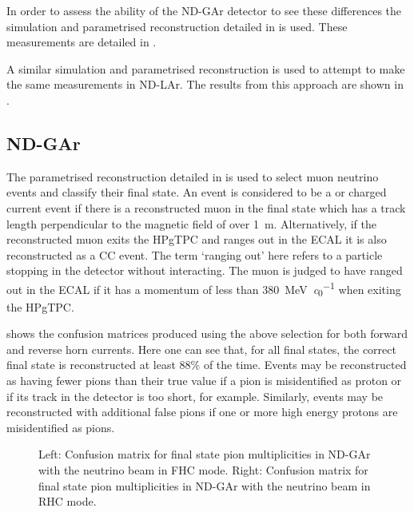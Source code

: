 In order to assess the ability of the ND-GAr detector to see these differences the simulation and parametrised reconstruction detailed in  is used.
These measurements are detailed in .

A similar simulation and parametrised reconstruction is used to attempt to make the same measurements in ND-LAr. 
The results from this approach are shown in .

\subsection{ND-GAr}
\label{sec:dune_ndrwt:pionMulti:gar}

The parametrised reconstruction detailed in  is used to select muon neutrino events and classify their final state.
An event is considered to be a \numu or \anumu charged current event if there is a reconstructed muon in the final state which has a track length perpendicular to the magnetic field of over \SI{1}{\metre}.
Alternatively, if the reconstructed muon exits the HPgTPC and ranges out in the ECAL it is also reconstructed as a \numu CC event.
The term `ranging out' here refers to a particle stopping in the detector without interacting.
The muon is judged to have ranged out in the ECAL if it has a momentum of less than \SI{380}{\MeV\per\clight} when exiting the HPgTPC. 

 shows the confusion matrices produced using the above selection for both forward and reverse horn currents. 
Here one can see that, for all final states, the correct final state is reconstructed at least 88\% of the time.
Events may be reconstructed as having fewer pions than their true value if a pion is misidentified as proton or if its track in the detector is too short, for example.
Similarly, events may be reconstructed with additional false pions if one or more high energy protons are misidentified as pions.

\begin{figure}[h]
	\begin{minipage}[t]{.5\linewidth}
		\begin{adjustbox}{max totalsize=\linewidth, center}
			
		\end{adjustbox}
	\end{minipage}
	\hfill
	\begin{minipage}[t]{.5\linewidth}
		\begin{adjustbox}{max totalsize=\linewidth, center}
			
		\end{adjustbox}
	\end{minipage}
	\caption[Confusion matrices for final state pion multiplicities in ND-GAr.]{Left: Confusion matrix for final state pion multiplicities in ND-GAr with the neutrino beam in FHC mode. Right: Confusion matrix for final state pion multiplicities in ND-GAr with the neutrino beam in RHC mode.}
	\label{fig:confusMatPi}
\end{figure}

